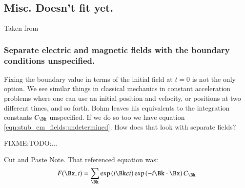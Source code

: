 
%
%



\chapter{}

%



\section{}

\section{Misc.  Doesn't fit yet. }

Taken from \cite{PJFourierVacuum}


\subsection{Separate electric and magnetic fields with the boundary conditions unspecified. }

Fixing the boundary value in terms of the initial field at $t=0$ is not the only option.  We see similar things in classical mechanics in constant acceleration problems where one can use an initial position and velocity, or positions at two different times, and so forth.  Bohm leaves his equivalents to the integration constants $C_{\Bk}$ unspecified.  If we do so too we have equation \ref{eqn:stub_em_fields:undetermined}.  How does that look with separate fields?

FIXME:TODO:...  

Cut and Paste Note.  That referenced equation was:
\begin{align}\label{eqn:stub_em_fields:undetermined}
F(\Bx,t) = \sum_{\Bk} 
\exp\left(i \Bk c t \right) 
\exp\left(-i \Bk \cdot \Bx \right) 
C_{\Bk} 
\end{align}

%
%

%
